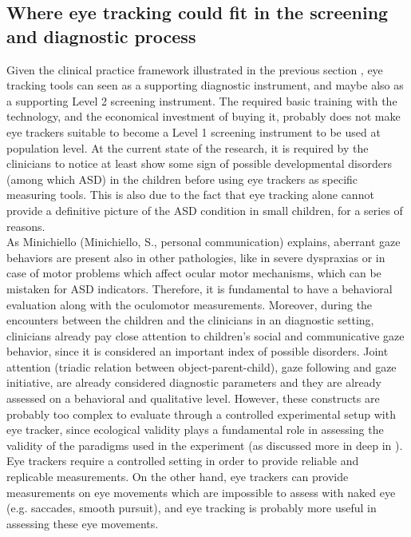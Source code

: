\subsection{Where eye tracking could fit in the screening and diagnostic process}
\label{sec:eyetrackingdiagnosis}
Given the clinical practice framework illustrated in the previous section , eye tracking tools can seen as a supporting diagnostic instrument, and maybe also as a supporting Level 2 screening instrument. The required basic training with the technology, and the economical investment of buying it, probably does not make eye trackers suitable to become a Level 1 screening instrument to be used at population level. At the current state of the research, it is required by the clinicians to notice at least show some sign of possible developmental disorders (among which ASD) in the children before using eye trackers as specific measuring tools. This is also due to the fact that eye tracking alone cannot provide a definitive picture of the ASD condition in small children, for a series of reasons.\\
As Minichiello (Minichiello, S., personal communication) explains, aberrant gaze behaviors are present also in other pathologies, like in severe dyspraxias or in case of motor problems which affect ocular motor mechanisms, which can be mistaken for ASD indicators. Therefore, it is fundamental to have a behavioral evaluation along with the oculomotor measurements.
Moreover, during the encounters between the children and the clinicians in an diagnostic setting, clinicians already pay close attention to children’s social and communicative gaze behavior, since it is considered an important index of possible disorders. Joint attention (triadic relation between object-parent-child), gaze following and gaze initiative, are already considered diagnostic parameters and they are already assessed on a behavioral and qualitative level. However, these constructs are probably too complex to evaluate through a controlled experimental setup with eye tracker, since ecological validity plays a fundamental role in assessing the validity of the paradigms used in the experiment (as discussed more in deep in ). Eye trackers require a controlled setting in order to provide reliable and replicable measurements. On the other hand, eye trackers can provide measurements on eye movements which are impossible to assess with naked eye (e.g. saccades, smooth pursuit), and eye tracking is probably more useful in assessing these eye movements.\\
